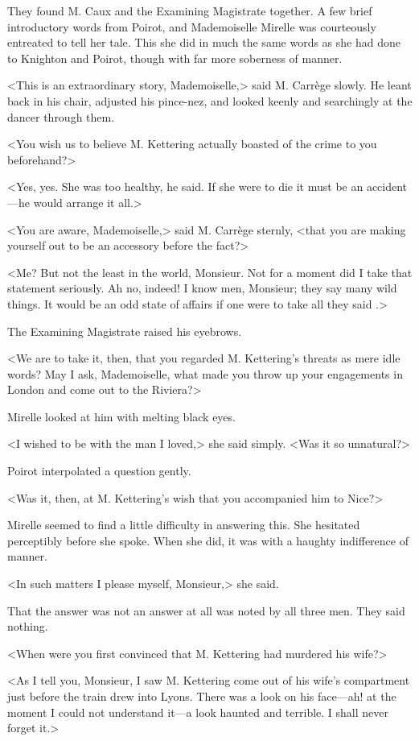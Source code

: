 They found M. Caux and the Examining Magistrate together. A few brief introductory words from Poirot, and Mademoiselle Mirelle was courteously entreated to tell her tale. This she did in much the same words as she had done to Knighton and Poirot, though with far more soberness of manner.

<This is an extraordinary story, Mademoiselle,> said M. Carrège slowly. He leant back in his chair, adjusted his pince-nez, and looked keenly and searchingly at the dancer through them.

<You wish us to believe M. Kettering actually boasted of the crime to you beforehand?>

<Yes, yes. She was too healthy, he said. If she were to die it must be an accident—he would arrange it all.>

<You are aware, Mademoiselle,> said M. Carrège sternly, <that you are making yourself out to be an accessory before the fact?>

<Me? But not the least in the world, Monsieur. Not for a moment did I take that statement seriously. Ah no, indeed! I know men, Monsieur; they say many wild things. It would be an odd state of affairs if one were to take all they said .>

The Examining Magistrate raised his eyebrows.

<We are to take it, then, that you regarded M. Kettering's threats as mere idle words? May I ask, Mademoiselle, what made you throw up your engagements in London and come out to the Riviera?>

Mirelle looked at him with melting black eyes.

<I wished to be with the man I loved,> she said simply. <Was it so unnatural?>

Poirot interpolated a question gently.

<Was it, then, at M. Kettering's wish that you accompanied him to Nice?>

Mirelle seemed to find a little difficulty in answering this. She hesitated perceptibly before she spoke. When she did, it was with a haughty indifference of manner.

<In such matters I please myself, Monsieur,> she said.

That the answer was not an answer at all was noted by all three men. They said nothing.

<When were you first convinced that M. Kettering had murdered his wife?>

<As I tell you, Monsieur, I saw M. Kettering come out of his wife's compartment just before the train drew into Lyons. There was a look on his face—ah! at the moment I could not understand it—a look haunted and terrible. I shall never forget it.>

